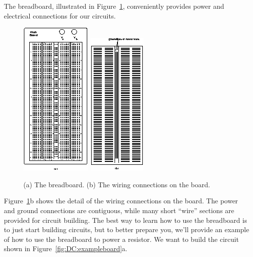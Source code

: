 The breadboard, illustrated in Figure~\ref{fig:DC:breadboard}, conveniently 
provides power and electrical connections for our circuits.   
\begin{figure}[!htb]
\centering \epsfysize=17cm \includegraphics[scale=4]{2_dc/breadboard.eps} 
\hspace*{1cm} \epsfysize=16cm \includegraphics[scale=4]{2_dc/backboard.eps} 
\caption{(a) The breadboard. (b) The wiring connections on the board.}
\label{fig:DC:breadboard}
\end{figure}
Figure~\ref{fig:DC:breadboard}b shows the detail of the wiring connections on
the board. The power and ground connections are contiguous, while many short
``wire'' sections are provided for circuit building.  The best way to learn how
to use the breadboard is to just start building circuits, but to better 
prepare you, we'll provide an example of how to use the breadboard to power a 
resistor. 
We want to build the circuit shown in Figure~\ref{fig:DC:exampleboard}a.
